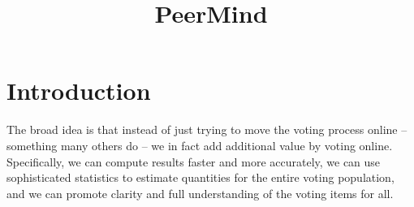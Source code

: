 \documentclass{sigchi}
\begin{document}
\title{PeerMind}


\maketitle

\begin{abstract}


\end{abstract}



\section{Introduction}

The broad idea is that instead of just trying to move the voting process online -- something many others do -- we in
fact add additional value by voting online.
Specifically, we can compute results faster and more accurately, we can use sophisticated statistics to estimate
quantities for the entire voting population, and we can promote clarity and full understanding of the voting items for all.

\end{document}
